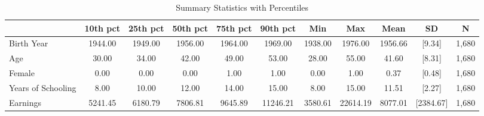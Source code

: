 \documentclass{article}
\begin{document}
\begin{table}[htbp] 
\centering 
\begin{threeparttable} 
\caption{Summary Statistics with Percentiles} 
\fontsize{small}{small}\selectfont 

\centering
\begin{tabular}{lllllllllll}
\toprule
\multicolumn{1}{c}{} &
  \multicolumn{1}{c}{10th pct} &
  \multicolumn{1}{c}{25th pct} &
  \multicolumn{1}{c}{50th pct} &
  \multicolumn{1}{c}{75th pct} &
  \multicolumn{1}{c}{90th pct} &
  \multicolumn{1}{c}{Min} &
  \multicolumn{1}{c}{Max} &
  \multicolumn{1}{c}{Mean} &
  \multicolumn{1}{c}{SD} &
  \multicolumn{1}{c}{N} \\
\midrule
\multicolumn{1}{l}{Birth Year} &
  \multicolumn{1}{c}{1944.00} &
  \multicolumn{1}{c}{1949.00} &
  \multicolumn{1}{c}{1956.00} &
  \multicolumn{1}{c}{1964.00} &
  \multicolumn{1}{c}{1969.00} &
  \multicolumn{1}{c}{1938.00} &
  \multicolumn{1}{c}{1976.00} &
  \multicolumn{1}{c}{1956.66} &
  \multicolumn{1}{c}{[9.34]} &
  \multicolumn{1}{c}{1,680} \\
\multicolumn{1}{l}{Age} &
  \multicolumn{1}{c}{30.00} &
  \multicolumn{1}{c}{34.00} &
  \multicolumn{1}{c}{42.00} &
  \multicolumn{1}{c}{49.00} &
  \multicolumn{1}{c}{53.00} &
  \multicolumn{1}{c}{28.00} &
  \multicolumn{1}{c}{55.00} &
  \multicolumn{1}{c}{41.60} &
  \multicolumn{1}{c}{[8.31]} &
  \multicolumn{1}{c}{1,680} \\
\multicolumn{1}{l}{Female} &
  \multicolumn{1}{c}{0.00} &
  \multicolumn{1}{c}{0.00} &
  \multicolumn{1}{c}{0.00} &
  \multicolumn{1}{c}{1.00} &
  \multicolumn{1}{c}{1.00} &
  \multicolumn{1}{c}{0.00} &
  \multicolumn{1}{c}{1.00} &
  \multicolumn{1}{c}{0.37} &
  \multicolumn{1}{c}{[0.48]} &
  \multicolumn{1}{c}{1,680} \\
\multicolumn{1}{l}{Years of Schooling} &
  \multicolumn{1}{c}{8.00} &
  \multicolumn{1}{c}{10.00} &
  \multicolumn{1}{c}{12.00} &
  \multicolumn{1}{c}{14.00} &
  \multicolumn{1}{c}{15.00} &
  \multicolumn{1}{c}{8.00} &
  \multicolumn{1}{c}{15.00} &
  \multicolumn{1}{c}{11.51} &
  \multicolumn{1}{c}{[2.27]} &
  \multicolumn{1}{c}{1,680} \\
\multicolumn{1}{l}{Earnings} &
  \multicolumn{1}{c}{5241.45} &
  \multicolumn{1}{c}{6180.79} &
  \multicolumn{1}{c}{7806.81} &
  \multicolumn{1}{c}{9645.89} &
  \multicolumn{1}{c}{11246.21} &
  \multicolumn{1}{c}{3580.61} &
  \multicolumn{1}{c}{22614.19} &
  \multicolumn{1}{c}{8077.01} &
  \multicolumn{1}{c}{[2384.67]} &
  \multicolumn{1}{c}{1,680} \\

\end{tabular}
\end{threeparttable}
\end{table}
\end{document}
